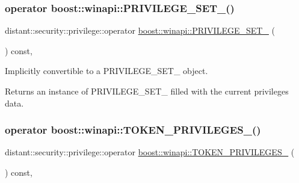 \subsubsection{\texorpdfstring{operator boost\+::winapi\+::\+P\+R\+I\+V\+I\+L\+E\+G\+E\+\_\+\+S\+E\+T\+\_\+()}{operator boost::winapi::PRIVILEGE\_SET\_()}}
{\footnotesize\ttfamily distant\+::security\+::privilege\+::operator \mbox{\hyperlink{structboost_1_1winapi_1_1___p_r_i_v_i_l_e_g_e___s_e_t__}{boost\+::winapi\+::\+P\+R\+I\+V\+I\+L\+E\+G\+E\+\_\+\+S\+E\+T\+\_\+}} (\begin{DoxyParamCaption}{ }\end{DoxyParamCaption}) const\hspace{0.3cm}{\ttfamily [inline]}, {\ttfamily [noexcept]}}

Implicitly convertible to a P\+R\+I\+V\+I\+L\+E\+G\+E\+\_\+\+S\+E\+T\+\_\+ object. \begin{DoxyReturn}{Returns}
an instance of P\+R\+I\+V\+I\+L\+E\+G\+E\+\_\+\+S\+E\+T\+\_\+ filled with the current privilege\textquotesingle{}s data. 
\end{DoxyReturn}
\mbox{\label{classdistant_1_1security_1_1privilege_a6e2459e68912b91a2480c8610c6cf583}} 
\subsubsection{\texorpdfstring{operator boost\+::winapi\+::\+T\+O\+K\+E\+N\+\_\+\+P\+R\+I\+V\+I\+L\+E\+G\+E\+S\+\_\+()}{operator boost::winapi::TOKEN\_PRIVILEGES\_()}}
{\footnotesize\ttfamily distant\+::security\+::privilege\+::operator \mbox{\hyperlink{structboost_1_1winapi_1_1___t_o_k_e_n___p_r_i_v_i_l_e_g_e_s__}{boost\+::winapi\+::\+T\+O\+K\+E\+N\+\_\+\+P\+R\+I\+V\+I\+L\+E\+G\+E\+S\+\_\+}} (\begin{DoxyParamCaption}{ }\end{DoxyParamCaption}) const\hspace{0.3cm}{\ttfamily [inline]}, {\ttfamily [noexcept]}}

